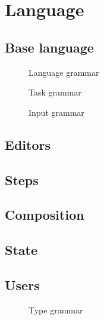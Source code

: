 


\section{Language}



\subsection{Base language}

\begin{figure}
  \caption{Language grammar} \label{fig:language-grammar}
\end{figure}

\begin{figure}
  \caption{Task grammar} \label{fig:task-grammar}
\end{figure}

\begin{figure}
  \caption{Input grammar} \label{fig:input-grammar}
\end{figure}



\subsection{Editors}



\subsection{Steps}



\subsection{Composition}



\subsection{State}



\subsection{Users}


\begin{figure}
  \caption{Type grammar} \label{fig:type-grammar}
\end{figure}


